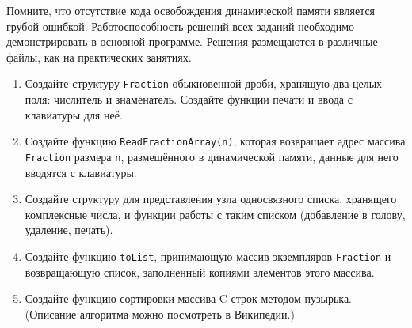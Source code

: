 Помните, что отсутствие кода освобождения динамической памяти является грубой
ошибкой. Работоспособность решений всех заданий необходимо демонстрировать в
основной программе. Решения размещаются в различные файлы, как на
практических занятиях.
\begin{enumerate}
    \itemsep=\myitemsep
    \item Создайте структуру \texttt{Fraction} обыкновенной дроби, хранящую два
    целых поля: числитель и знаменатель. Создайте функции печати и ввода с
    клавиатуры для неё.
    
    \item Создайте функцию \texttt{ReadFractionArray(n)}, которая 
    возвращает адрес массива \texttt{Fraction} размера \texttt{n},
    размещённого в динамической памяти, данные для него вводятся с
    клавиатуры.
    
    \item Создайте структуру для представления узла односвязного списка,
    хранящего комплексные числа, и функции работы с таким списком (добавление в
    голову, удаление, печать).
    
    \item Создайте функцию \texttt{toList}, принимающую массив экземпляров
    \texttt{Fraction} и возвращающую список, заполненный копиями элементов этого
    массива.

    \item Создайте функцию сортировки массива C-строк
    методом пузырька. (Описание алгоритма можно посмотреть в Википедии.)
\end{enumerate}